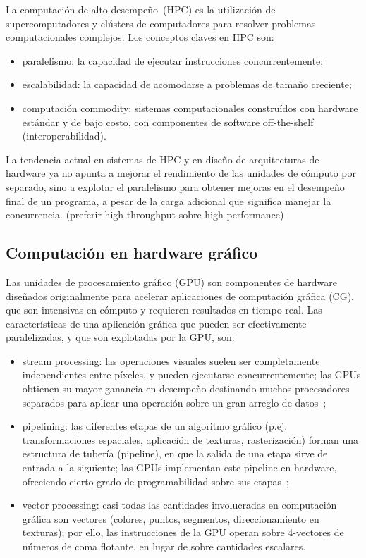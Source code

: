 \documentclass[11pt,spanish]{article}
\begin{document}
La computación de alto desempeño~(HPC) es la utilización de supercomputadores y
clústers de computadores para resolver problemas computacionales complejos.  Los
conceptos claves en HPC son:
\begin{itemize}
   \item paralelismo:
     la capacidad de ejecutar instrucciones concurrentemente;
   \item escalabilidad:
     la capacidad de acomodarse a problemas de tamaño creciente;
   \item computación commodity:
     sistemas computacionales construídos con hardware
     estándar y de bajo costo, con componentes de software off-the-shelf
     (interoperabilidad).
\end{itemize}
La tendencia actual en sistemas de HPC y en diseño de arquitecturas de hardware
ya no apunta a mejorar el rendimiento de las unidades de cómputo por separado,
sino a explotar el paralelismo para obtener mejoras en el desempeño final de un
programa, a pesar de la carga adicional que significa manejar la concurrencia.
(preferir high throughput sobre high performance)
\cite{hpc-gpu-cuda-slides}

\subsection{Computación en hardware gráfico}
Las unidades de procesamiento gráfico (GPU) son componentes de hardware diseñados
originalmente para acelerar aplicaciones de computación gráfica (CG), que son
intensivas en cómputo y requieren resultados en tiempo real.  Las
características de una aplicación gráfica que pueden ser efectivamente
paralelizadas, y que son explotadas por la GPU, son:
\begin{itemize}
  \item stream processing:
    las operaciones visuales suelen ser completamente independientes entre
    píxeles, y pueden ejecutarse concurrentemente;  las GPUs obtienen su mayor
    ganancia en desempeño destinando muchos procesadores
    separados para aplicar una operación sobre un gran arreglo de
    datos~\cite[\S3.2]{gpupp};
  \item pipelining:
    las diferentes etapas de un algoritmo gráfico (p.ej.
    transformaciones espaciales, aplicación de texturas, rasterización)
    forman una estructura de tubería (pipeline), en que la salida de una etapa
    sirve de entrada a la siguiente;  las GPUs implementan este pipeline en
    hardware, ofreciendo cierto grado de programabilidad sobre sus
    etapas~\cite[\S3.1]{pygpu};
  \item vector processing:
    casi todas las cantidades involucradas en computación
    gráfica son vectores (colores, puntos, segmentos, direccionamiento en
    texturas); por ello, las instrucciones de la GPU operan sobre 4-vectores de
    números de coma flotante, en lugar de sobre cantidades escalares.
    \cite[\S3.3]{gpupp}
\end{itemize}
\end{document}
